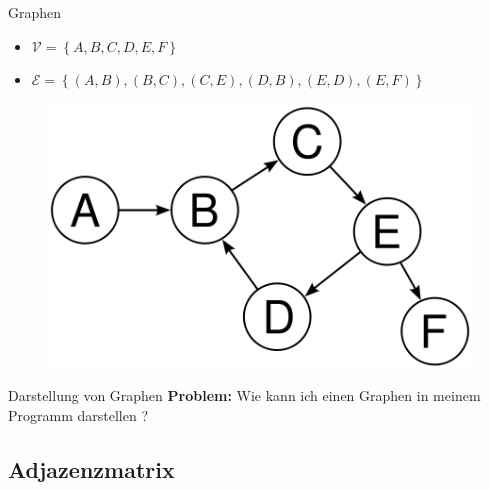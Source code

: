 \documentclass[18pt]{beamer}
\begin{document}
\begin{frame}{Graphen}

        \begin{exampleblock}{}
            \begin{itemize}
                \item $\mathcal{V} = \left\{ A, B, C, D, E, F \right\}$
                \item $\mathcal{E} = \left\{ (A, B), (B, C), (C, E), (D, B), (E, D), (E, F) \right\}$
            \end{itemize}
        \end{exampleblock}


        \begin{figure}
            \includegraphics[scale=.3]{img/graph.png}
        \end{figure}

\end{frame}

\begin{frame}{Darstellung von Graphen}
    \textbf{Problem:} Wie kann ich einen Graphen in meinem Programm darstellen ?
\end{frame}


\subsection{Adjazenzmatrix}
\end{document}

